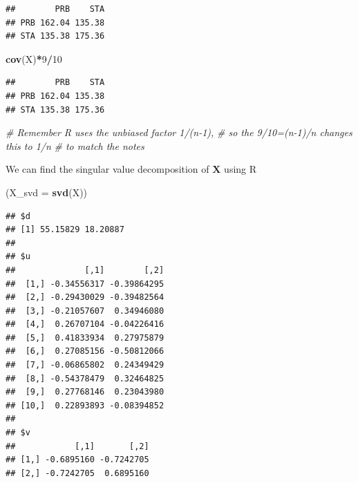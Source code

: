 \documentclass[]{book}
\newenvironment{Shaded}{\begin{snugshade}}{\end{snugshade}}
\newcommand{\CommentTok}[1]{\textcolor[rgb]{0.56,0.35,0.01}{\textit{#1}}}
\newcommand{\DataTypeTok}[1]{\textcolor[rgb]{0.13,0.29,0.53}{#1}}
\newcommand{\DecValTok}[1]{\textcolor[rgb]{0.00,0.00,0.81}{#1}}
\newcommand{\KeywordTok}[1]{\textcolor[rgb]{0.13,0.29,0.53}{\textbf{#1}}}
\newcommand{\NormalTok}[1]{#1}
\newcommand{\OperatorTok}[1]{\textcolor[rgb]{0.81,0.36,0.00}{\textbf{#1}}}
\newcommand{\StringTok}[1]{\textcolor[rgb]{0.31,0.60,0.02}{#1}}
\theoremstyle{definition}
\theoremstyle{definition}
\theoremstyle{definition}
\theoremstyle{remark}
\begin{document}
\begin{Shaded}
\end{Shaded}

\begin{verbatim}
##        PRB    STA
## PRB 162.04 135.38
## STA 135.38 175.36
\end{verbatim}

\begin{Shaded}
\begin{Highlighting}[]
\KeywordTok{cov}\NormalTok{(X)}\OperatorTok{*}\DecValTok{9}\OperatorTok{/}\DecValTok{10} 
\end{Highlighting}
\end{Shaded}

\begin{verbatim}
##        PRB    STA
## PRB 162.04 135.38
## STA 135.38 175.36
\end{verbatim}

\begin{Shaded}
\begin{Highlighting}[]
\CommentTok{# Remember R uses the unbiased factor 1/(n-1), }
\CommentTok{# so the 9/10=(n-1)/n changes this to 1/n }
\CommentTok{# to match the notes}
\end{Highlighting}
\end{Shaded}

We can find the singular value decomposition of \(\mathbf X\) using R

\begin{Shaded}
\begin{Highlighting}[]
\NormalTok{(}\DataTypeTok{X_svd =} \KeywordTok{svd}\NormalTok{(X))}
\end{Highlighting}
\end{Shaded}

\begin{verbatim}
## $d
## [1] 55.15829 18.20887
## 
## $u
##              [,1]        [,2]
##  [1,] -0.34556317 -0.39864295
##  [2,] -0.29430029 -0.39482564
##  [3,] -0.21057607  0.34946080
##  [4,]  0.26707104 -0.04226416
##  [5,]  0.41833934  0.27975879
##  [6,]  0.27085156 -0.50812066
##  [7,] -0.06865802  0.24349429
##  [8,] -0.54378479  0.32464825
##  [9,]  0.27768146  0.23043980
## [10,]  0.22893893 -0.08394852
## 
## $v
##            [,1]       [,2]
## [1,] -0.6895160 -0.7242705
## [2,] -0.7242705  0.6895160
\end{verbatim}
\end{document}
